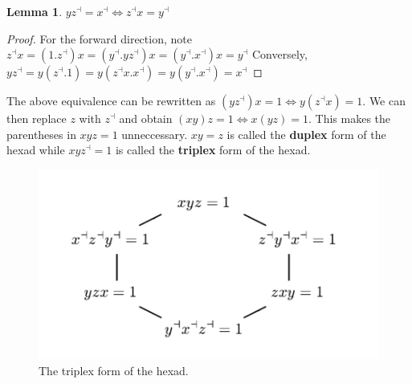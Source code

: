 \documentclass[11pt]{report}
\theoremstyle{plain}
\theoremstyle{definition}
\newtheorem{lemma}[theorem]{Lemma}
\begin{document}
\begin{lemma}
$ yz^\dashv = x^\dashv \Leftrightarrow z^\dashv x = y^\dashv $
\end{lemma}
\begin{proof}
For the  forward direction, note $z^\dashv x =(1.z^\dashv) x = (y^\dashv.yz^\dashv)x = (y^\dashv.x^\dashv)x = y^\dashv$ Conversely, $yz^\dashv  =y(z^\dashv.1) = y(z^\dashv x .x^\dashv) =y (y^\dashv.x^\dashv) = x^\dashv$
\end{proof}
The above equivalence can be rewritten as $ (yz^\dashv)x = 1 \Leftrightarrow y(z^\dashv x) = 1. $ We can then replace $ z $ with $ z^\dashv $ and obtain $ (xy)z = 1 \Leftrightarrow x(yz) =1 $. This makes the parentheses in $ xyz  = 1$ unneccessary. $ xy=z  $ is called the \textbf{duplex} form of the hexad while $ xyz^\dashv =1 $ is called the \textbf{triplex} form of the hexad.
\begin{figure}[h]
	\includegraphics[scale = 0.9]{onqando1}
	\centering
	\caption{The triplex form of the hexad.}
\end{figure}
\end{document}
